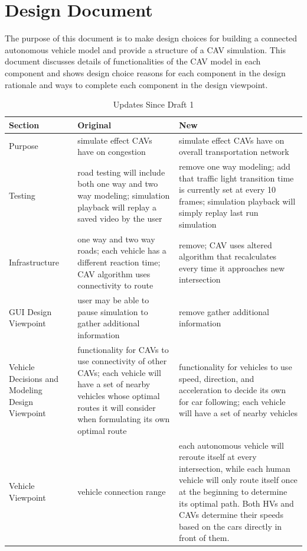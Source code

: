 \documentclass[onecolumn, draftclsnofoot,10pt, compsoc]{IEEEtran}
\begin{document}
\section{Design Document}
The purpose of this document is to make design choices for building a connected autonomous vehicle model and provide a structure of a CAV simulation.
This document discusses details of functionalities of the CAV model in each component and shows design choice reasons for each component in the design rationale and ways to complete each component in the design viewpoint.
\begin{table}[h]
\caption{Updates Since Draft 1}
\begin{tabular}{|p{1in}|p{2.5in}|p{2.5in}|}
\hline
Section                                         & Original  & New \\ \hline
Purpose                                         & simulate effect CAVs have on congestion & simulate effect CAVs have on overall transportation network \\ \hline
Testing                                         & road testing will include both one way and two way modeling; simulation playback will replay a saved video by the user & remove one way modeling; add that traffic light transition time is currently set at every 10 frames; simulation playback will simply replay last run simulation \\ \hline
Infrastructure                                  & one way and two way roads; each vehicle has a different reaction time; CAV algorithm uses connectivity to route & remove; CAV uses altered algorithm that recalculates every time it approaches new intersection \\ \hline
GUI Design Viewpoint                            & user may be able to pause simulation to gather additional information & remove gather additional information \\ \hline
Vehicle Decisions and Modeling Design Viewpoint & functionality for CAVs to use connectivity of other CAVs; each vehicle will have a set of nearby vehicles whose optimal routes it will consider when formulating its own optimal route & functionality for vehicles to use speed, direction, and acceleration to decide its own for car following; each vehicle will have a set of nearby vehicles \\ \hline
Vehicle Viewpoint                               & vehicle connection range & each autonomous vehicle will reroute itself at every intersection, while each human vehicle will only route itself once at the beginning to determine its optimal path. Both HVs and CAVs determine their speeds based on the cars directly in front of them. \\ \hline

\end{tabular}
\end{table}
\end{document}
